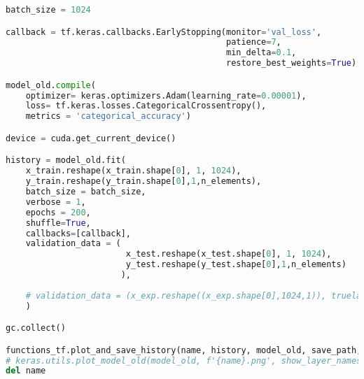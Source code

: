 \begin{lstlisting}[language=Python]
batch_size = 1024

callback = tf.keras.callbacks.EarlyStopping(monitor='val_loss', 
                                            patience=7, 
                                            min_delta=0.1,
                                            restore_best_weights=True)

model_old.compile(
    optimizer= keras.optimizers.Adam(learning_rate=0.00001),
    loss= tf.keras.losses.CategoricalCrossentropy(),
    metrics = 'categorical_accuracy')

device = cuda.get_current_device()

history = model_old.fit(
    x_train.reshape(x_train.shape[0], 1, 1024),
    y_train.reshape(y_train.shape[0],1,n_elements),
    batch_size = batch_size,
    verbose = 1,
    epochs = 200,
    shuffle=True,
    callbacks=[callback],
    validation_data = (
                        x_test.reshape(x_test.shape[0], 1, 1024),
                        y_test.reshape(y_test.shape[0],1,n_elements)
                       ),
    
    # validation_data = (x_exp.reshape((x_exp.shape[0],1024,1)), truelabels.reshape(213, 81)),
    )

gc.collect()

functions_tf.plot_and_save_history(name, history, model_old, save_path, subfolder=subfolder)
# keras.utils.plot_model_old(model_old, f'{name}.png', show_layer_names=True, show_layer_activations=True, show_shapes=True)
del name
\end{lstlisting}

